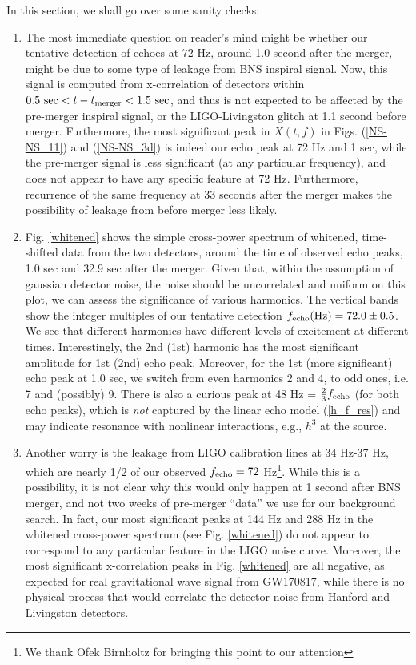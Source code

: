 \documentclass[12pt]{article}
\begin{document}
In this section, we shall go over some sanity checks: 
\begin{enumerate}

\item The most immediate question on reader's mind might be whether our tentative detection of echoes at $72$ Hz, around 1.0 second after the merger, might be due to some type of leakage from BNS inspiral signal. Now, this signal is computed from x-correlation of detectors within $0.5 ~{\rm sec}<  t - t_{\rm merger} < 1.5 ~{\rm sec}$, and thus is not expected to be affected by the pre-merger inspiral signal, or the LIGO-Livingston glitch at 1.1 second before merger. Furthermore, the most significant peak in $X(t,f)$ in Figs. (\ref{NS-NS_11}) and (\ref{NS-NS_3d}) is indeed our echo peak at 72 Hz and 1 sec, while the pre-merger signal is less significant (at any particular frequency), and does not appear to have any specific feature at 72 Hz. Furthermore, recurrence of the same frequency at 33 seconds after the merger makes the possibility of leakage from before merger less likely.

\item Fig. \ref{whitened} shows the simple cross-power spectrum of whitened, time-shifted data from the two detectors, around the time of observed echo peaks, 1.0 sec and 32.9 sec after the merger. Given that, within the assumption of gaussian detector noise, the noise should be uncorrelated and uniform on this plot, we can assess the significance of various harmonics. The vertical bands show the integer multiples of our tentative detection $f_{\rm echo}({\rm Hz}) = 72.0 \pm 0.5$. We see that different harmonics have different levels of excitement at different times. Interestingly, the 2nd (1st) harmonic has the most significant amplitude for 1st (2nd) echo peak. Moreover, for the 1st (more significant) echo peak at 1.0 sec, we switch from even harmonics 2 and 4, to odd ones, i.e. 7 and (possibly) 9. There is also a curious peak at 48 Hz = $\frac{2}{3} f_{\rm echo}$ (for both echo peaks), which is {\it not} captured by the linear echo model (\ref{h_f_res}) and may indicate resonance with nonlinear interactions, e.g., $h^3$ at the source. 

\item Another worry is the leakage from LIGO calibration lines at 34 Hz-37 Hz, which are nearly 1/2 of our observed $f_{\rm echo} = 72$ Hz\footnote{We thank Ofek Birnholtz for bringing this point to our attention}. While this is a possibility, it is not clear why this would only happen at 1 second after BNS merger, and not two weeks of pre-merger ``data'' we use for our background search. In fact, our most significant peaks at 144 Hz and 288 Hz in the whitened cross-power spectrum  (see Fig. \ref{whitened}) do not appear to correspond to any particular feature in the LIGO noise curve. Moreover, the most significant x-correlation peaks in Fig. \ref{whitened} are all negative, as expected for real gravitational wave signal from GW170817, while there is no physical process that would correlate the detector noise from Hanford and Livingston detectors.  


\end{enumerate}
\end{document}
